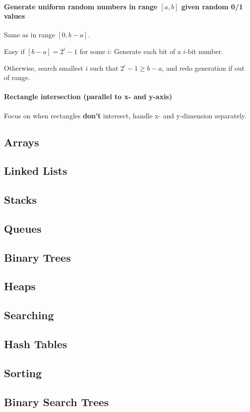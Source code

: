 \documentclass[runningheads]{llncs}
\begin{document}
\paragraph{Generate uniform random numbers in range $[a,b]$ given random 0/1 values}
Same as in range $[0, b-a]$.

Easy if $[b-a] = 2^i - 1$ for some $i$: Generate each bit of a $i$-bit number.

Otherwise, search smallest $i$ such that $2^i - 1 \geq b - a$, and redo generation if out of range.


\paragraph{Rectangle intersection (parallel to x- and y-axis)}
Focus on when rectangles \textbf{don't} intersect, handle x- and y-dimension separately.

\subsection{Arrays}
\subsection{Linked Lists}
\subsection{Stacks}
\subsection{Queues}
\subsection{Binary Trees}
\subsection{Heaps}
\subsection{Searching}
\subsection{Hash Tables}
\subsection{Sorting}
\subsection{Binary Search Trees}
\end{document}
